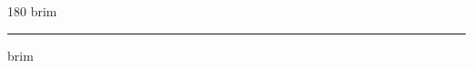 
\begin{frame}
\begin{center}
\begin{turn}{180}
{\fontsize{2.5cm}{1em}\selectfont brim}
\end{turn}
\vspace{1em}\par  
\hrule
\vspace{1em}\par  
{\fontsize{2.5cm}{1em}\selectfont brim}
\end{center}
\end{frame}
